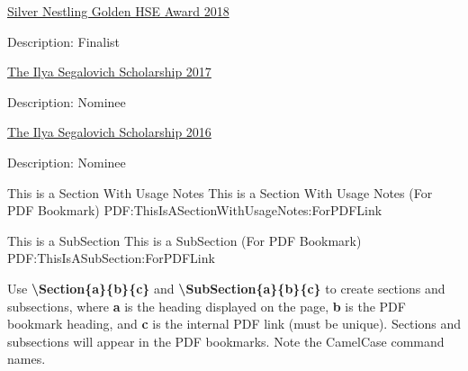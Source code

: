 \documentclass[letterpaper,MMMyyyy,nonstopmode]{simpleresumecv}
\newcommand{\Code}[1]{\mbox{\textbf{#1}}}
\newcommand{\CodeCommand}[1]{\mbox{\textbf{\textbackslash{#1}}}}
\begin{document}
\begin{Body}
\BulletItem
\href{https://www.hse.ru/gold/cm/silver/2018/gadetsky}{Silver Nestling Golden HSE Award 2018}
\begin{Detail}
\Item
Description: Finalist
\end{Detail}

\BulletItem
\href{https://yandex.com/scholarships/students}{The Ilya Segalovich Scholarship 2017}
\begin{Detail}
\Item
Description: Nominee
\end{Detail}

\BulletItem
\href{https://yandex.com/scholarships/students}{The Ilya Segalovich Scholarship 2016}
\begin{Detail}
\Item
Description: Nominee
\end{Detail}


\iffalse

\Section
{Languages}
{Languages}
{PDF:Languages}

\BulletItem
Russian: Mother tongue.

\Gap
\BulletItem
English: Fluent


\Section
{Skills}
{Skills}
{PDF:Skills}

\BulletItem
Machine Learning, Deep Learning, Probabilistic Machine Learning

\BulletItem
Python, Pytorch, Feel free with Linux
\fi

\iffalse

\begingroup
\color{red}

\Section
{This is a\newline
Section\newline
With\newline
Usage Notes}
{This is a Section With Usage Notes (For PDF Bookmark)}
{PDF:ThisIsASectionWithUsageNotes:ForPDFLink}

\SubSection
{This is a SubSection}
{This is a SubSection (For PDF Bookmark)}
{PDF:ThisIsASubSection:ForPDFLink}

\Gap
\BulletItem
Use \CodeCommand{Section\{a\}\{b\}\{c\}} and
\CodeCommand{SubSection\{a\}\{b\}\{c\}}
to create sections and subsections, where
\Code{a} is the heading displayed on the page,
\Code{b} is the PDF bookmark heading, and
\Code{c} is the internal PDF link (must be unique).
Sections and subsections will appear in the PDF bookmarks.
Note the CamelCase command names.


\end{Body}
\end{document}
